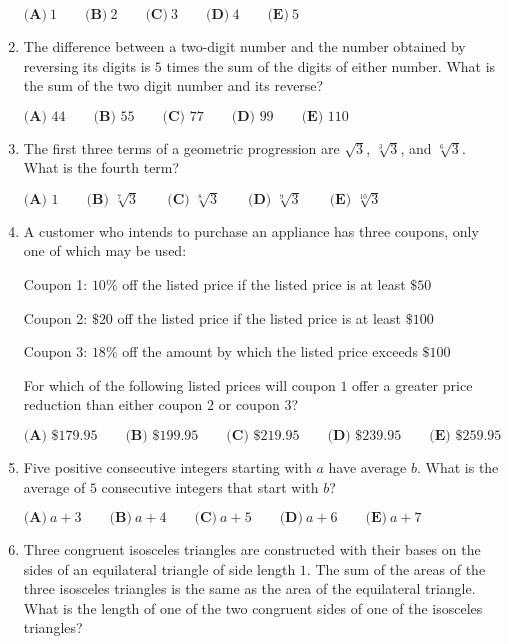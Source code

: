 \documentclass{article}
\begin{document}
\begin{enumerate}[label=\arabic*., itemsep=0.5em]
$ \textbf{(A)}\ 1\qquad\textbf{(B)}\ 2\qquad\textbf{(C)}\ 3\qquad\textbf{(D)}\ 4\qquad\textbf{(E)}\ 5$\par \vspace{0.5em}\item The difference between a two-digit number and the number obtained by reversing its digits is $5$ times the sum of the digits of either number.  What is the sum of the two digit number and its reverse?

$\textbf{(A) }44\qquad
\textbf{(B) }55\qquad
\textbf{(C) }77\qquad
\textbf{(D) }99\qquad
\textbf{(E) }110$\par \vspace{0.5em}\item The first three terms of a geometric progression are $\sqrt 3$, $\sqrt[3]3$, and $\sqrt[6]3$.  What is the fourth term?

$\textbf{(A) }1\qquad
\textbf{(B) }\sqrt[7]3\qquad
\textbf{(C) }\sqrt[8]3\qquad
\textbf{(D) }\sqrt[9]3\qquad
\textbf{(E) }\sqrt[10]3\qquad$\par \vspace{0.5em}\item A customer who intends to purchase an appliance has three coupons, only one of which may be used:

Coupon 1: $10\%$ off the listed price if the listed price is at least $\$50$

Coupon 2: $\$20$ off the listed price if the listed price is at least $\$100$

Coupon 3: $18\%$ off the amount by which the listed price exceeds $\$100$

For which of the following listed prices will coupon $1$ offer a greater price reduction than either coupon $2$ or coupon $3$?

$\textbf{(A) }\$179.95\qquad
\textbf{(B) }\$199.95\qquad
\textbf{(C) }\$219.95\qquad
\textbf{(D) }\$239.95\qquad
\textbf{(E) }\$259.95\qquad$\par \vspace{0.5em}\item Five positive consecutive integers starting with $a$ have average $b$. What is the average of $5$ consecutive integers that start with $b$?

$ \textbf{(A)}\ a+3\qquad\textbf{(B)}\ a+4\qquad\textbf{(C)}\ a+5\qquad\textbf{(D)}\ a+6\qquad\textbf{(E)}\ a+7$\par \vspace{0.5em}\item Three congruent isosceles triangles are constructed with their bases on the sides of an equilateral triangle of side length $1$.  The sum of the areas of the three isosceles triangles is the same as the area of the equilateral triangle.  What is the length of one of the two congruent sides of one of the isosceles triangles?


\end{enumerate}
\end{document}
